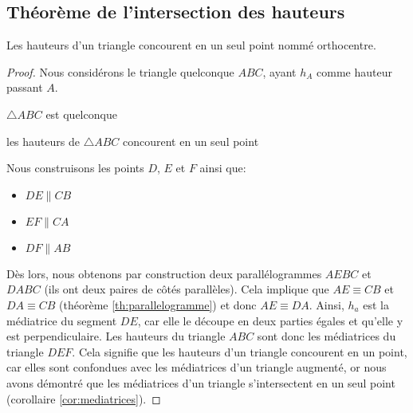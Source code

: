 \documentclass[a4paper,12pt]{article}
\begin{document}
\pagebreak
\subsection{Théorème de l'intersection des hauteurs}
\begin{theorem}
Les hauteurs d'un triangle concourent en un seul point nommé orthocentre.
\end{theorem}

\begin{proof}
Nous considérons le triangle quelconque $ABC$, ayant $h_A$ comme hauteur passant $A$.
\begin{hyp}
$\triangle ABC$ est quelconque
\end{hyp}
\begin{concl}
les hauteurs de $\triangle ABC$ concourent en un seul point
\end{concl}
Nous construisons les points $D$, $E$ et $F$ ainsi que:
\begin{itemize}
    \item $DE \parallel CB$
    \item $EF \parallel CA$
    \item $DF \parallel AB$
\end{itemize}
Dès lors, nous obtenons par construction deux parallélogrammes $AEBC$ et $DABC$ (ils ont deux paires de côtés parallèles). Cela implique que $AE \equiv CB$ et $DA \equiv CB$ (théorème \ref{th:parallelogramme}) et donc $AE \equiv DA$. Ainsi, $h_a$ est la médiatrice du segment $DE$, car elle le découpe en deux parties égales et qu'elle y est perpendiculaire. Les hauteurs du triangle $ABC$ sont donc les médiatrices du triangle $DEF$. Cela signifie que les hauteurs d'un triangle concourent en un point, car elles sont confondues avec les médiatrices d'un triangle augmenté, or nous avons démontré que les médiatrices d'un triangle s'intersectent en un seul point (corollaire \ref{cor:mediatrices}).
\end{proof}
\end{document}
